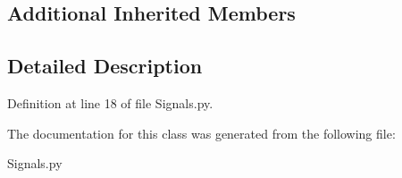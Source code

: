 \subsection*{Additional Inherited Members}


\subsection{Detailed Description}


Definition at line 18 of file Signals.\+py.



The documentation for this class was generated from the following file\+:\begin{DoxyCompactItemize}
\item 
Signals.\+py\end{DoxyCompactItemize}
